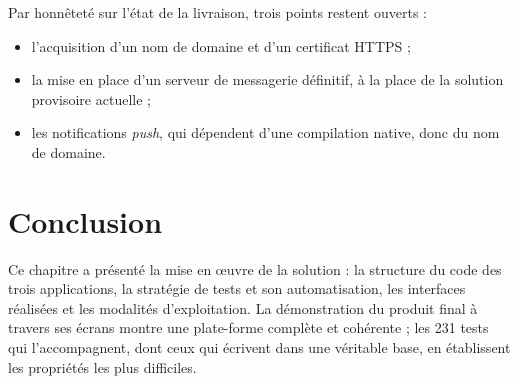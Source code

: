 Par honnêteté sur l'état de la livraison, trois points restent ouverts :

\begin{itemize}[leftmargin=1.2cm]
  \item l'acquisition d'un nom de domaine et d'un certificat HTTPS ;
  \item la mise en place d'un serveur de messagerie définitif, à la place de la
  solution provisoire actuelle ;
  \item les notifications \textit{push}, qui dépendent d'une compilation
  native, donc du nom de domaine.
\end{itemize}

\section*{Conclusion}

Ce chapitre a présenté la mise en \oe uvre de la solution : la structure du code
des trois applications, la stratégie de tests et son automatisation, les
interfaces réalisées et les modalités d'exploitation. La démonstration du
produit final à travers ses écrans montre une plate-forme complète et
cohérente ; les 231 tests qui l'accompagnent, dont ceux qui écrivent dans une
véritable base, en établissent les propriétés les plus difficiles.
